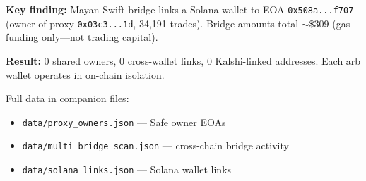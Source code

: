 \documentclass[11pt,a4paper]{article}
\begin{document}
\textbf{Key finding:} Mayan Swift bridge links a Solana wallet to EOA \texttt{0x508a...f707} (owner of proxy \texttt{0x03c3...1d}, 34,191 trades). Bridge amounts total $\sim$\$309 (gas funding only---not trading capital).

\textbf{Result:} 0 shared owners, 0 cross-wallet links, 0 Kalshi-linked addresses. Each arb wallet operates in on-chain isolation.

Full data in companion files:
\begin{itemize}[nosep,leftmargin=*]
\item \texttt{data/proxy\_owners.json} --- Safe owner EOAs
\item \texttt{data/multi\_bridge\_scan.json} --- cross-chain bridge activity
\item \texttt{data/solana\_links.json} --- Solana wallet links
\end{itemize}
\end{document}
